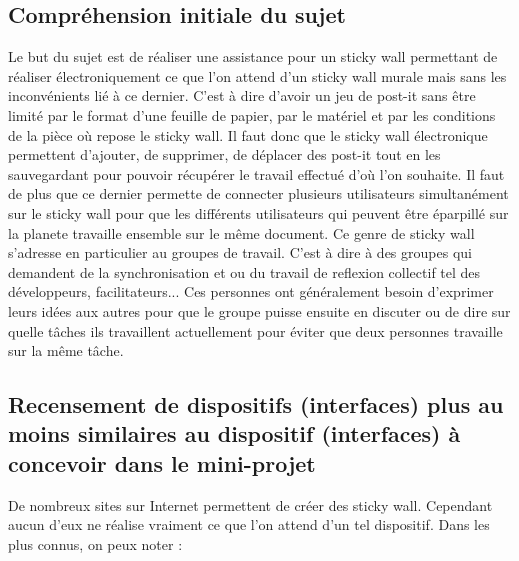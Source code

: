 \documentclass{article}
\begin{document}
\subsection{Compréhension initiale du sujet}
\hspace*{0.6cm}Le but du sujet est de réaliser une assistance pour un sticky wall permettant de réaliser électroniquement ce que l'on attend d'un sticky wall murale mais sans les inconvénients lié à ce dernier. C'est à dire d'avoir un jeu de post-it sans être limité par le format d'une feuille de papier, par le matériel et par les conditions de la pièce où repose le sticky wall. Il faut donc que le sticky wall électronique permettent d'ajouter, de supprimer, de déplacer des post-it tout en les sauvegardant pour pouvoir récupérer le travail effectué d'où l'on souhaite. Il faut de plus que ce dernier permette de connecter plusieurs utilisateurs simultanément sur le sticky wall pour que les différents utilisateurs qui peuvent être éparpillé sur la planete travaille ensemble sur le même document. Ce genre de sticky wall s'adresse en particulier au groupes de travail. C'est à dire à des groupes qui demandent de la synchronisation et ou du travail de reflexion collectif tel des développeurs, facilitateurs... Ces personnes ont généralement besoin d'exprimer leurs idées aux autres pour que le groupe puisse ensuite en discuter ou de dire sur quelle tâches ils travaillent actuellement pour éviter que deux personnes travaille sur la même tâche.
\subsection{Recensement de dispositifs (interfaces) plus au moins similaires au dispositif (interfaces) à concevoir dans le mini-projet}
\hspace*{0.6cm}De nombreux sites sur Internet permettent de créer des sticky wall. Cependant aucun d'eux ne réalise vraiment ce que l'on attend d'un tel dispositif. Dans les plus connus, on peux noter :\\
\end{document}
